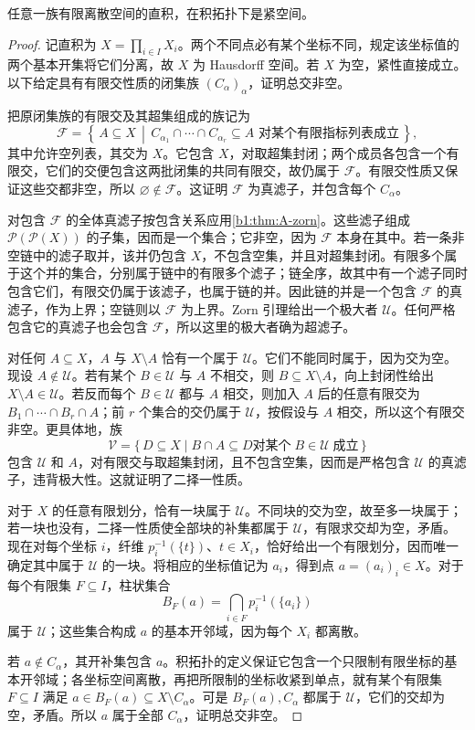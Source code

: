 \begin{lemma}\label{b1:lem:finite-discrete-product-compact}
	任意一族有限离散空间的直积，在积拓扑下是紧空间。
\end{lemma}
\begin{proof}
	记直积为 \(X=\prod_{i\in I}X_i\)。两个不同点必有某个坐标不同，规定该坐标值的两个基本开集将它们分离，故 \(X\) 为 Hausdorff 空间。若 \(X\) 为空，紧性直接成立。以下给定具有有限交性质的闭集族 \((C_\alpha)_\alpha\)，证明总交非空。

	把原闭集族的有限交及其超集组成的族记为
	\[
		\mathcal F= \left\{\,A\subseteq X\,\middle|\, C_{\alpha_1}\cap\cdots\cap C_{\alpha_r}\subseteq A \text{ 对某个有限指标列表成立}\,\right\},
	\]
	其中允许空列表，其交为 \(X\)。它包含 \(X\)，对取超集封闭；两个成员各包含一个有限交，它们的交便包含这两批闭集的共同有限交，故仍属于 \(\mathcal F\)。有限交性质又保证这些交都非空，所以 \(\varnothing\notin\mathcal F\)。这证明 \(\mathcal F\) 为真滤子，并包含每个 \(C_\alpha\)。

	对包含 \(\mathcal F\) 的全体真滤子按包含关系应用\cref{b1:thm:A-zorn}。这些滤子组成 \(\mathcal P(\mathcal P(X))\) 的子集，因而是一个集合；它非空，因为 \(\mathcal F\) 本身在其中。若一条非空链中的滤子取并，该并仍包含 \(X\)，不包含空集，并且对超集封闭。有限多个属于这个并的集合，分别属于链中的有限多个滤子；链全序，故其中有一个滤子同时包含它们，有限交仍属于该滤子，也属于链的并。因此链的并是一个包含 \(\mathcal F\) 的真滤子，作为上界；空链则以 \(\mathcal F\) 为上界。Zorn 引理给出一个极大者 \(\mathcal U\)。任何严格包含它的真滤子也会包含 \(\mathcal F\)，所以这里的极大者确为超滤子。

	对任何 \(A\subseteq X\)，\(A\) 与 \(X\setminus A\) 恰有一个属于 \(\mathcal U\)。它们不能同时属于，因为交为空。现设 \(A\notin\mathcal U\)。若有某个 \(B\in\mathcal U\) 与 \(A\) 不相交，则 \(B\subseteq X\setminus A\)，向上封闭性给出 \(X\setminus A\in\mathcal U\)。若反而每个 \(B\in\mathcal U\) 都与 \(A\) 相交，则加入 \(A\) 后的任意有限交为 \(B_1\cap\cdots\cap B_r\cap A\)；前 \(r\) 个集合的交仍属于 \(\mathcal U\)，按假设与 \(A\) 相交，所以这个有限交非空。更具体地，族
	\[
		\mathcal V=\{\,D\subseteq X\mid B\cap A\subseteq D \text{对某个}\;B\in\mathcal U\;\text{成立}\,\}
	\]
	包含 \(\mathcal U\) 和 \(A\)，对有限交与取超集封闭，且不包含空集，因而是严格包含 \(\mathcal U\) 的真滤子，违背极大性。这就证明了二择一性质。

	对于 \(X\) 的任意有限划分，恰有一块属于 \(\mathcal U\)。不同块的交为空，故至多一块属于；若一块也没有，二择一性质使全部块的补集都属于 \(\mathcal U\)，有限求交却为空，矛盾。现在对每个坐标 \(i\)，纤维 \(p_i^{-1}(\{t\})\)、\(t\in X_i\)，恰好给出一个有限划分，因而唯一确定其中属于 \(\mathcal U\) 的一块。将相应的坐标值记为 \(a_i\)，得到点 \(a=(a_i)_i\in X\)。对于每个有限集 \(F\subseteq I\)，柱状集合
	\[
		B_F(a)=\bigcap_{i\in F}p_i^{-1}(\{a_i\})
	\]
	属于 \(\mathcal U\)；这些集合构成 \(a\) 的基本开邻域，因为每个 \(X_i\) 都离散。

	若 \(a\notin C_\alpha\)，其开补集包含 \(a\)。积拓扑的定义保证它包含一个只限制有限坐标的基本开邻域；各坐标空间离散，再把所限制的坐标收紧到单点，就有某个有限集 \(F\subseteq I\) 满足 \(a\in B_F(a)\subseteq X\setminus C_\alpha\)。可是 \(B_F(a),C_\alpha\) 都属于 \(\mathcal U\)，它们的交却为空，矛盾。所以 \(a\) 属于全部 \(C_\alpha\)，证明总交非空。
\end{proof}

